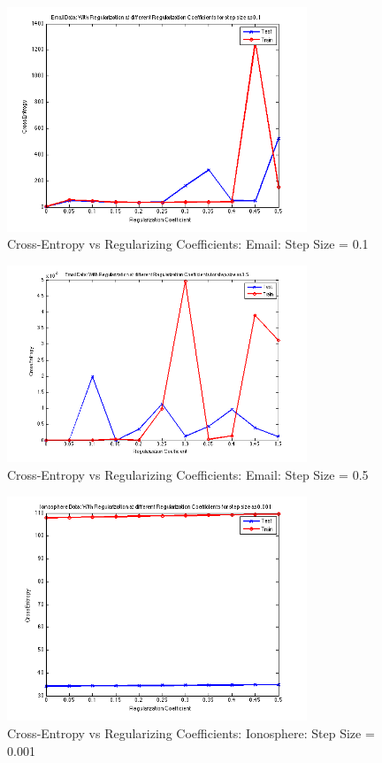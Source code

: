 \documentclass[paper=a4, fontsize=11pt]{scrartcl} %
\numberwithin{equation}{section} %
\numberwithin{figure}{section} %
\numberwithin{table}{section} %
\begin{document}
\begin{figure}[h!]
  \caption{Cross-Entropy vs Regularizing Coefficients: Email: Step Size = 0.1}
  \centering
    \includegraphics[width=0.8\textwidth]{../Pics/subGraphsEmail/Fig4.png}
\end{figure}

\begin{figure}[h!]
  \caption{Cross-Entropy vs Regularizing Coefficients: Email: Step Size = 0.5}
  \centering
    \includegraphics[width=0.8\textwidth]{../Pics/subGraphsEmail/Fig5.png}
\end{figure}


\begin{figure}[h!]
  \caption{Cross-Entropy vs Regularizing Coefficients: Ionosphere: Step Size = 0.001}
  \centering
    \includegraphics[width=0.8\textwidth]{../Pics/subGraphIono/Fig1.png}
\end{figure}
\end{document}

